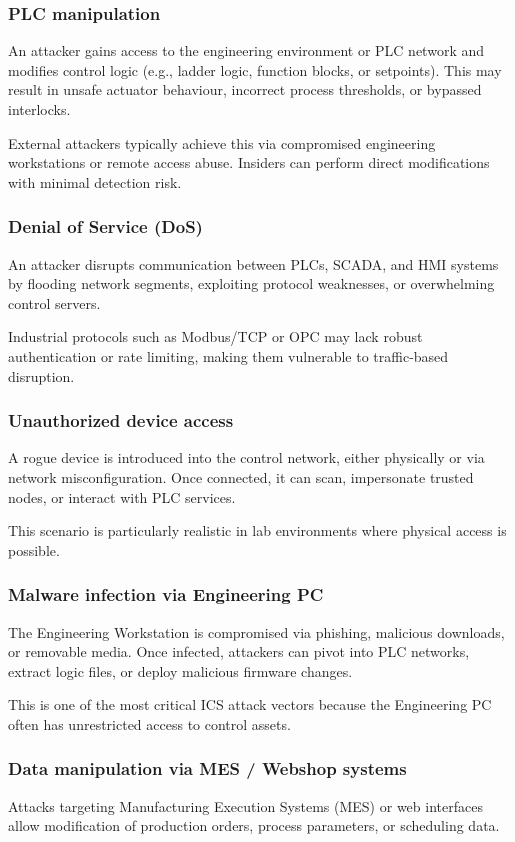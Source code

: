 \subsubsection{PLC manipulation}
An attacker gains access to the engineering environment or PLC network and modifies control logic (e.g., ladder logic, function blocks, or setpoints). This may result in unsafe actuator behaviour, incorrect process thresholds, or bypassed interlocks.

External attackers typically achieve this via compromised engineering workstations or remote access abuse. Insiders can perform direct modifications with minimal detection risk.

\subsubsection{Denial of Service (DoS)}
An attacker disrupts communication between PLCs, SCADA, and HMI systems by flooding network segments, exploiting protocol weaknesses, or overwhelming control servers.

Industrial protocols such as Modbus/TCP or OPC may lack robust authentication or rate limiting, making them vulnerable to traffic-based disruption.

\subsubsection{Unauthorized device access}
A rogue device is introduced into the control network, either physically or via network misconfiguration. Once connected, it can scan, impersonate trusted nodes, or interact with PLC services.

This scenario is particularly realistic in lab environments where physical access is possible.

\subsubsection{Malware infection via Engineering PC}
The Engineering Workstation is compromised via phishing, malicious downloads, or removable media. Once infected, attackers can pivot into PLC networks, extract logic files, or deploy malicious firmware changes.

This is one of the most critical ICS attack vectors because the Engineering PC often has unrestricted access to control assets.

\subsubsection{Data manipulation via MES / Webshop systems}
Attacks targeting Manufacturing Execution Systems (MES) or web interfaces allow modification of production orders, process parameters, or scheduling data.

